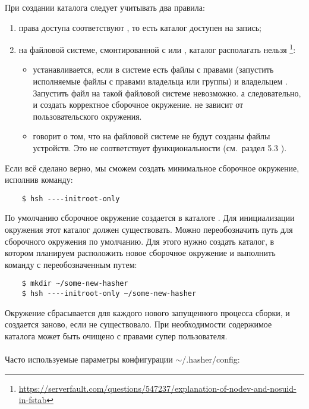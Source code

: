 \begin{itemize}
	При создании каталога  следует учитывать два правила:
	\begin{enumerate}
		\item права доступа соответствуют , то есть каталог доступен на запись;
		\item на файловой системе, смонтированной с  или , каталог располагать нельзя%
		\footnote{\href{https://serverfault.com/questions/547237/explanation-of-nodev-and-nosuid-in-fstab}{https://serverfault.com/questions/547237/explanation-of-nodev-and-nosuid-in-fstab}}:
		\begin{itemize}
			\item {} устанавливается, если в системе есть файлы с правами 
			(запустить исполняемые файлы с правами владельца или группы) и владельцем .
			Запустить файл  на такой файловой системе невозможно. а следовательно,
			и создать корректное сборочное окружение.  не зависит от пользовательского окружения.
			\item {} говорит о том, что на файловой системе не будут созданы файлы устройств.
			Это не соответствует функциональности  (см.~раздел 5.3
			\hyperlink{mount_fs_hasher}{}).
		\end{itemize}
	\end{enumerate}
\end{itemize}
Если всё сделано верно, мы сможем создать минимальное сборочное окружение, исполнив команду:
\begin{verbatim}
	$ hsh ----initroot-only
\end{verbatim}
По умолчанию сборочное окружение создается в каталоге . Для инициализации окружения
этот каталог должен существовать. Можно переобозначить путь для сборочного окружения по умолчанию.
Для этого нужно создать каталог, в котором планируем расположить новое сборочное окружение и выполнить
команду с переобозначенным путем:
\begin{verbatim}
	$ mkdir ~/some-new-hasher
	$ hsh ----initroot-only ~/some-new-hasher
\end{verbatim}
Окружение сбрасывается для каждого нового запущенного процесса сборки, и создается заново, если
не существовало. При необходимости содержимое каталога может быть очищено с правами
супер пользователя.\\
\\
Часто используемые параметры конфигурации $\sim$/.hasher/config:
